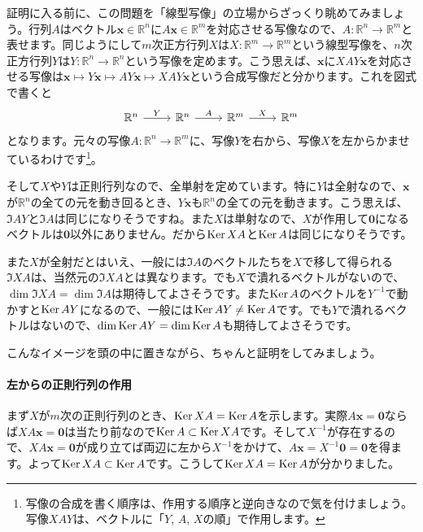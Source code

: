証明に入る前に、この問題を「線型写像」の立場からざっくり眺めてみましょう。行列$A$はベクトル$\bm{x} \in \mathbb{R}^n$に$A\bm{x} \in \mathbb{R}^m$を対応させる写像なので、$A\colon \mathbb{R}^n \rightarrow \mathbb{R}^m$と表せます。同じようにして$m$次正方行列$X$は$X\colon \mathbb{R}^m\rightarrow\mathbb{R}^m$という線型写像を、$n$次正方行列$Y$は$Y\colon \mathbb{R}^n\rightarrow\mathbb{R}^n$という写像を定めます。こう思えば、$\bm{x}$に$XAY\bm{x}$を対応させる写像は$\bm{x}\mapsto Y\bm{x} \mapsto AY\bm{x} \mapsto XAY\bm{x}$という合成写像だと分かります。これを図式で書くと
\[
\begin{tikzcd}
\mathbb{R}^n \arrow{r}{Y} & \mathbb{R}^n \arrow{r}{A} & \mathbb{R}^m \arrow{r}{X} & \mathbb{R}^m
\end{tikzcd}
\]
となります。元々の写像$A\colon \mathbb{R}^n\rightarrow\mathbb{R}^m$に、写像$Y$を右から、写像$X$を左からかませているわけです\footnote{写像の合成を書く順序は、作用する順序と逆向きなので気を付けましょう。写像$XAY$は、ベクトルに「$Y$, $A$, $X$の順」で作用します。}。 %

そして$X$や$Y$は正則行列なので、全単射を定めています。特に$Y$は全射なので、$\bm{x}$が$\mathbb{R}^n$の全ての元を動き回るとき、$Y\bm{x}$も$\mathbb{R}^n$の全ての元を動きます。こう思えば、$\Im AY$と$\Im A$は同じになりそうですね。また$X$は単射なので、$X$が作用して$\bm{0}$になるベクトルは$\bm{0}$以外にありません。だから$\operatorname{Ker} XA$と$\operatorname{Ker} A$は同じになりそうです。

また$X$が全射だとはいえ、一般には$\Im A$のベクトルたちを$X$で移して得られる$\Im XA$は、当然元の$\Im XA$とは異なります。でも$X$で潰れるベクトルがないので、$\dim \Im XA = \dim \Im A$は期待してよさそうです。また$\operatorname{Ker} A$のベクトルを$Y^{-1}$で動かすと$\operatorname{Ker} AY$になるので、一般には$\operatorname{Ker} AY \neq \operatorname{Ker} A$です。でも$Y$で潰れるベクトルはないので、$\dim \operatorname{Ker} AY = \dim \operatorname{Ker} A$も期待してよさそうです。

こんなイメージを頭の中に置きながら、ちゃんと証明をしてみましょう。

\paragraph{左からの正則行列の作用}

まず$X$が$m$次の正則行列のとき、$\operatorname{Ker} XA = \operatorname{Ker} A$を示します。実際$A\bm{x} = \bm{0}$ならば$XA\bm{x} = \bm{0}$は当たり前なので$\operatorname{Ker} A\subset \operatorname{Ker} XA$です。そして$X^{-1}$が存在するので、$XA\bm{x} = \bm{0}$が成り立てば両辺に左から$X^{-1}$をかけて、$A\bm{x} = X^{-1}\bm{0} = \bm{0}$を得ます。よって$\operatorname{Ker} XA \subset \operatorname{Ker} A$です。こうして$\operatorname{Ker} XA = \operatorname{Ker} A$が分かりました。

